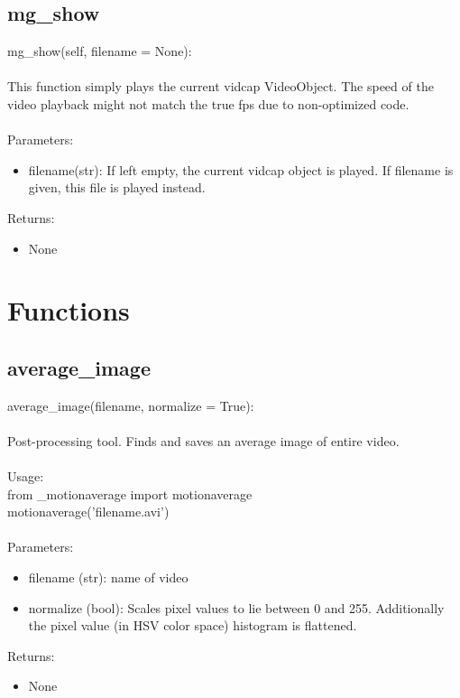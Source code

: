 \documentclass[9pt]{extarticle}
\begin{document}
\subsection{mg\_show}
mg\_show(self, filename = None):
\\\\
This function simply plays the current vidcap VideoObject. The speed of the video playback 
might not match the true fps due to non-optimized code. 
\\\\
Parameters:
\begin{itemize}
\item[] filename(str): If left empty, the current vidcap object is played. If filename is given,
this file is played instead.
\end{itemize}
Returns:
\begin{itemize}
    \item[] None
\end{itemize}



\section{Functions}
\subsection{average\_image}
    average\_image(filename, normalize = True):
    \\\\
    Post-processing tool. Finds and saves an average image of entire video. \\\\Usage:\\
    from \_motionaverage import motionaverage
    \\motionaverage('filename.avi')
    \\\\
    Parameters:
    \begin{itemize}
        \item [] filename (str): name of video 
        \item [] normalize (bool): Scales pixel values to lie between 0 and 255. Additionally the pixel value (in HSV color space) histogram is flattened.  
    \end{itemize}
    Returns:
    \begin{itemize}
        \item [] None
    \end{itemize}
\end{document}
